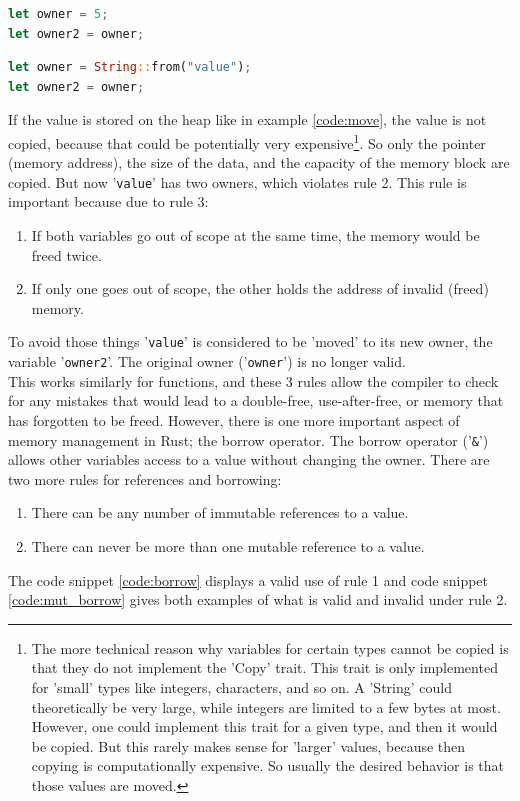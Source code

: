\begin{minipage}{\textwidth}
\begin{lstlisting}[style=colorEX,language=Rust,caption={Simple example of a copy},label={code:copy}]
let owner = 5;
let owner2 = owner;
\end{lstlisting}
\end{minipage}

\begin{minipage}{\textwidth}
\begin{lstlisting}[style=colorEX,language=Rust,caption={Simple example of a move},label={code:move}]
let owner = String::from("value");
let owner2 = owner;
\end{lstlisting}
\end{minipage}

If the value is stored on the heap like in example \ref{code:move}, the value is not copied, because that could
be potentially very expensive\footnote{The more technical reason why variables for certain types cannot be copied
is that they do not implement the 'Copy' trait. This trait is only implemented for 'small' types like integers,
characters, and so on. A 'String' could theoretically be very large, while integers are limited to a few bytes at most.
However, one could implement this trait for a given type, and then it would be copied.
But this rarely makes sense for 'larger' values, because then copying is computationally expensive.
So usually the desired behavior is that those values are moved.}.
So only the pointer (memory address), the size of the data, and the capacity of the memory block are copied.
But now '\lstinline{value}' has two owners, which violates rule 2.
This rule is important because due to rule 3:
\begin{enumerate}
    \item If both variables go out of scope at the same time, the memory would be freed twice.
    \item If only one goes out of scope, the other holds the address of invalid (freed) memory.
\end{enumerate}
To avoid those things '\lstinline{value}' is considered to be 'moved' to its new owner, the variable '\lstinline{owner2}'.
The original owner ('\lstinline{owner}') is no longer valid.\\
This works similarly for functions, and these 3 rules allow the compiler to check for any mistakes that would lead to
a double-free, use-after-free, or memory that has forgotten to be freed.
However, there is one more important aspect of memory management in Rust; the borrow operator.
The borrow operator ('\lstinline{&}') \cite{rust_borrow} allows other variables access to a value without changing the owner.
There are two more rules for references and borrowing:
\begin{enumerate}
    \item There can be any number of immutable references to a value.
    \item There can never be more than one mutable reference to a value.
\end{enumerate}
The code snippet \ref{code:borrow} displays a valid use of rule 1 and code snippet \ref{code:mut_borrow} gives both examples
of what is valid and invalid under rule 2.


